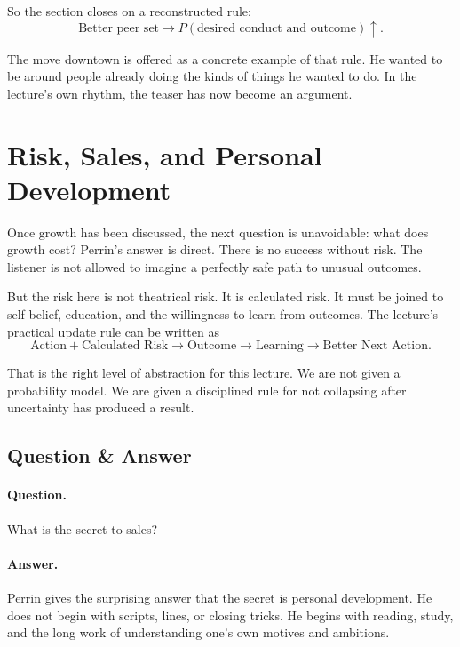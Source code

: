 So the section closes on a reconstructed rule:
\begin{equation}
\text{Better peer set} \to P(\text{desired conduct and outcome}) \uparrow .
\end{equation}

The move downtown is offered as a concrete example of that rule. He wanted to be around people already doing the kinds of things he wanted to do. In the lecture's own rhythm, the teaser has now become an argument.

\section{Risk, Sales, and Personal Development}

Once growth has been discussed, the next question is unavoidable: what does growth cost? Perrin's answer is direct. There is no success without risk. The listener is not allowed to imagine a perfectly safe path to unusual outcomes.

But the risk here is not theatrical risk. It is calculated risk. It must be joined to self-belief, education, and the willingness to learn from outcomes. The lecture's practical update rule can be written as
\begin{equation}
\text{Action} + \text{Calculated Risk} \to \text{Outcome} \to \text{Learning} \to \text{Better Next Action}.
\end{equation}

That is the right level of abstraction for this lecture. We are not given a probability model. We are given a disciplined rule for not collapsing after uncertainty has produced a result.

\subsection{Question \& Answer}

\paragraph{Question.} What is the secret to sales?

\paragraph{Answer.} Perrin gives the surprising answer that the secret is personal development. He does not begin with scripts, lines, or closing tricks. He begins with reading, study, and the long work of understanding one's own motives and ambitions.

